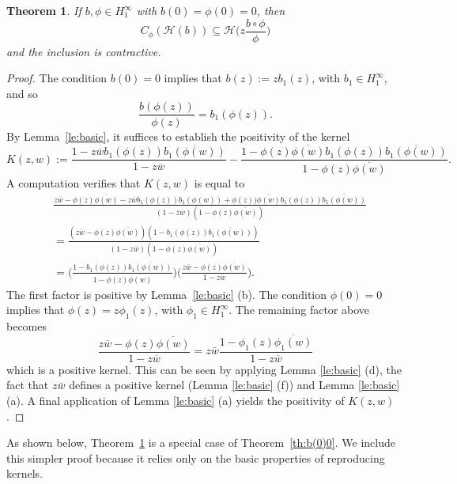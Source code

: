 \documentclass[11pt]{amsart}
\def\HH{{\mathcal H}}
\renewcommand{\subset}{\subseteq}
\numberwithin{equation}{section}
\theoremstyle{plain}
\newtheorem{theorem}[equation]{Theorem}
\theoremstyle{definition}
\begin{document}
\begin{theorem}\label{th:b(0)0, phi(0)0}
	If $b, \phi \in H^{\infty}_{1}$ with $b(0)=\phi(0)=0$, then 
	\begin{equation*}\label{eq:b(0)=0old}
			C_\phi(\HH(b))\subset \HH\Big(z \frac{b\circ\phi}{\phi}\Big)
	\end{equation*}
	and the inclusion is contractive.
\end{theorem}

\begin{proof}
	The condition $b(0) = 0$ implies that $b(z):=zb_1(z)$, with $b_1 \in H^{\infty}_{1}$, and so 
	$$\frac{b(\phi(z))}{\phi(z)}=b_1(\phi(z)).$$  By Lemma~\ref{le:basic}, it suffices to establish the positivity of the kernel
\[
K(z,w):=\frac{1-z \overline{w} b_1(\phi(z))\overline{b_1(\phi(w))}}{1-z \overline{w}}-\frac{1-\phi(z)\overline{\phi(w)} b_1(\phi(z))\overline{b_1(\phi(w))}}{1-\phi(z)\overline{\phi(w)}}.
\]	
A computation verifies  that $K(z, w)$ is equal to 
\begin{align*}
	&\frac{z\overline{w}-\phi(z)\overline{\phi(w)}-z\overline{w} b_1(\phi(z))\overline{b_1(\phi(w))}+\phi(z))\overline{\phi(w)}b_1(\phi(z))\overline{b_1(\phi(w))}}{(1-z\overline{w})(1-\phi(z)\overline{\phi(w)})}\\
	&= \frac{(z\overline{w}-\phi(z)\overline{\phi(w)})(1-b_1(\phi(z))\overline{b_1(\phi(w))})}{(1-z\overline{w})(1-\phi(z)\overline{\phi(w)})}\\
    & = \Big(\frac{1-b_1(\phi(z))\overline{b_1(\phi(w))}}{1-\phi(z)\overline{\phi(w)}}\Big) \Big(\frac{z\overline{w}-\phi(z)\overline{\phi(w)}}{1-z\overline{w}}\Big).
\end{align*}
The first factor
	is positive by Lemma~\ref{le:basic} (b). The  condition $\phi(0)=0$ implies  that $\phi(z)=z\phi_1(z)$, with $\phi_1 \in H^{\infty}_{1}$. The remaining factor above becomes
	\[
	\frac{z\overline{w}-\phi(z)\overline{\phi(w)}}{1-z\overline{w}}=z\bar w \frac{1-\phi_1(z)\overline{\phi_1(w)}}{1-z\overline{w}}
	\] 
	which is a positive kernel. This can be seen by applying Lemma \ref{le:basic} (d), the fact that $z \bar w$ defines a positive kernel (Lemma \ref{le:basic} (f)) and Lemma \ref{le:basic} (a). A final application of Lemma \ref{le:basic} (a) yields the positivity of $K(z, w)$.
\end{proof}

As shown below, Theorem~\ref{th:b(0)0, phi(0)0} is a special  case of Theorem~\ref{th:b(0)0}. We include this simpler proof because it relies only on the basic properties of reproducing kernels.
\end{document}
